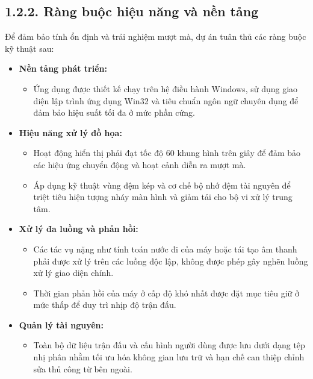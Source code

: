 \subsection*{1.2.2. Ràng buộc hiệu năng và nền tảng}

\noindent \indent Để đảm bảo tính ổn định và trải nghiệm mượt mà, dự án tuân thủ các ràng buộc kỹ thuật sau:

\begin{itemize}
    \item \textbf{Nền tảng phát triển:} 
    \begin{itemize}
        \item Ứng dụng được thiết kế chạy trên hệ điều hành Windows, sử dụng giao diện lập trình ứng dụng Win32 và tiêu chuẩn ngôn ngữ chuyên dụng để đảm bảo hiệu suất tối đa ở mức phần cứng.
    \end{itemize}

    \item \textbf{Hiệu năng xử lý đồ họa:}
    \begin{itemize}
        \item Hoạt động hiển thị phải đạt tốc độ 60 khung hình trên giây để đảm bảo các hiệu ứng chuyển động và hoạt cảnh diễn ra mượt mà.
        \item Áp dụng kỹ thuật vùng đệm kép và cơ chế bộ nhớ đệm tài nguyên để triệt tiêu hiện tượng nháy màn hình và giảm tải cho bộ vi xử lý trung tâm.
    \end{itemize}

    \item \textbf{Xử lý đa luồng và phản hồi:}
    \begin{itemize}
        \item Các tác vụ nặng như tính toán nước đi của máy hoặc tái tạo âm thanh phải được xử lý trên các luồng độc lập, không được phép gây nghẽn luồng xử lý giao diện chính.
        \item Thời gian phản hồi của máy ở cấp độ khó nhất được đặt mục tiêu giữ ở mức thấp để duy trì nhịp độ trận đấu.
    \end{itemize}

    \item \textbf{Quản lý tài nguyên:}
    \begin{itemize}
        \item Toàn bộ dữ liệu trận đấu và cấu hình người dùng được lưu dưới dạng tệp nhị phân nhằm tối ưu hóa không gian lưu trữ và hạn chế can thiệp chỉnh sửa thủ công từ bên ngoài.
    \end{itemize}
\end{itemize}



